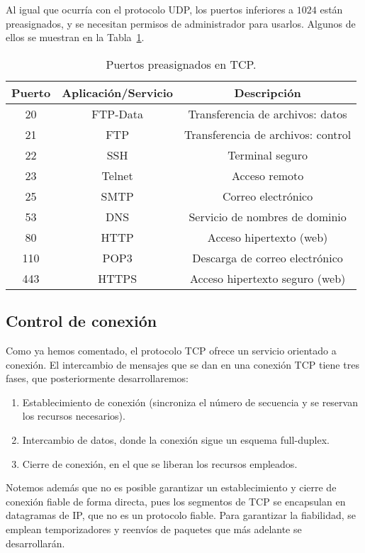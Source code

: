 Al igual que ocurría con el protocolo \acrshort{UDP}, los puertos inferiores a $1024$ están preasignados, y se necesitan permisos de administrador para usarlos. Algunos de ellos se muestran en la Tabla~\ref{tab:puertos-tcp}.
\begin{table}
    \centering
    \begin{tabular}{|c|c|c|}
        \hline Puerto & Aplicación/Servicio & Descripción\\\hline
        20 & \acrshort{FTP}-Data & Transferencia de archivos: datos\\
        21 & \acrshort{FTP} & Transferencia de archivos: control\\
        22 & \acrshort{SSH} & Terminal seguro\\
        23 & \acrshort{Telnet} & Acceso remoto\\
        25 & \acrshort{SMTP} & Correo electrónico\\
        53 & \acrshort{DNS} & Servicio de nombres de dominio\\
        80 & \acrshort{HTTP} & Acceso hipertexto (web)\\
        110 & \acrshort{POP3} & Descarga de correo electrónico\\
        443 & \acrshort{HTTPS} & Acceso hipertexto seguro (web)\\ \hline
    \end{tabular}
    \caption{Puertos preasignados en \acrshort{TCP}.}
    \label{tab:puertos-tcp}
\end{table}

\subsection{Control de conexión}
Como ya hemos comentado, el protocolo \acrshort{TCP} ofrece un servicio orientado a conexión. El intercambio de mensajes que se dan en una conexión \acrshort{TCP} tiene tres fases, que posteriormente desarrollaremos:
\begin{enumerate}
    \item Establecimiento de conexión (sincroniza el número de secuencia y se reservan los recursos necesarios).
    \item Intercambio de datos, donde la conexión sigue un esquema full-duplex.
    \item Cierre de conexión, en el que se liberan los recursos empleados.
\end{enumerate}

Notemos además que no es posible garantizar un establecimiento y cierre de conexión fiable de forma directa, pues los segmentos de \acrshort{TCP} se encapsulan en datagramas de \acrshort{IP}, que no es un protocolo fiable. Para garantizar la fiabilidad, se emplean temporizadores y reenvíos de paquetes que más adelante se desarrollarán.

